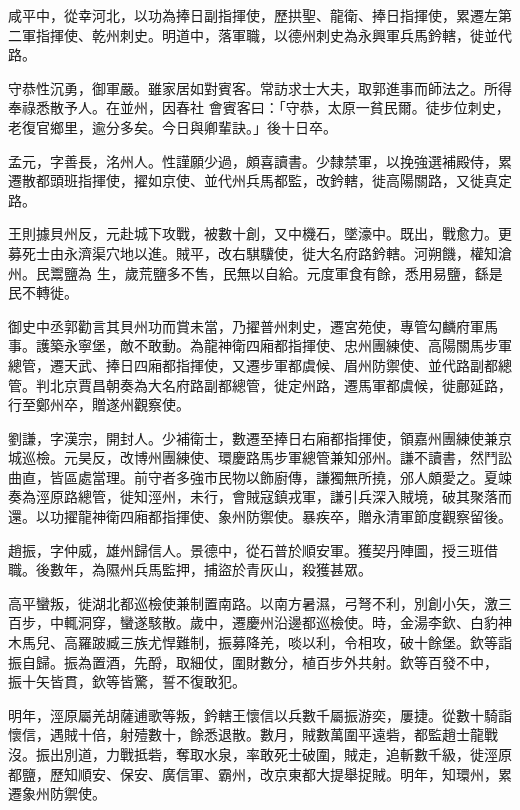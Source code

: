 \begin{pinyinscope}
 咸平中，從幸河北，以功為捧日副指揮使，歷拱聖、龍衛、捧日指揮使，累遷左第二軍指揮使、乾州刺史。明道中，落軍職，以德州刺史為永興軍兵馬鈐轄，徙並代路。



 守恭性沉勇，御軍嚴。雖家居如對賓客。常訪求士大夫，取郭進事而師法之。所得奉祿悉散予人。在並州，因春社
 會賓客曰：「守恭，太原一貧民爾。徒步位刺史，老復官鄉里，逾分多矣。今日與卿輩訣。」後十日卒。



 孟元，字善長，洺州人。性謹願少過，頗喜讀書。少隸禁軍，以挽強選補殿侍，累遷散都頭班指揮使，擢如京使、並代州兵馬都監，改鈐轄，徙高陽關路，又徙真定路。



 王則據貝州反，元赴城下攻戰，被數十創，又中機石，墜濠中。既出，戰愈力。更募死士由永濟渠穴地以進。賊平，改右騏驥使，徙大名府路鈐轄。河朔饑，權知滄州。民鬻鹽為
 生，歲荒鹽多不售，民無以自給。元度軍食有餘，悉用易鹽，繇是民不轉徙。



 御史中丞郭勸言其貝州功而賞未當，乃擢普州刺史，遷宮苑使，專管勾麟府軍馬事。護築永寧堡，敵不敢動。為龍神衛四廂都指揮使、忠州團練使、高陽關馬步軍總管，遷天武、捧日四廂都指揮使，又遷步軍都虞候、眉州防禦使、並代路副都總管。判北京賈昌朝奏為大名府路副都總管，徙定州路，遷馬軍都虞候，徙鄜延路，行至鄭州卒，贈遂州觀察使。



 劉謙，字漢宗，開封人。少補衛士，數遷至捧日右廂都指揮使，領嘉州團練使兼京城巡檢。元昊反，改博州團練使、環慶路馬步軍總管兼知邠州。謙不讀書，然鬥訟曲直，皆區處當理。前守者多強市民物以飾廚傳，謙獨無所撓，邠人頗愛之。夏竦奏為涇原路總管，徙知涇州，未行，會賊寇鎮戎軍，謙引兵深入賊境，破其聚落而還。以功擢龍神衛四廂都指揮使、象州防禦使。暴疾卒，贈永清軍節度觀察留後。



 趙振，字仲威，雄州歸信人。景德中，從石普於順安軍。獲契丹陣圖，授三班借職。後數年，為隰州兵馬監押，捕盜於青灰山，殺獲甚眾。



 高平蠻叛，徙湖北都巡檢使兼制置南路。以南方暑濕，弓弩不利，別創小矢，激三百步，中輒洞穿，蠻遂駭散。歲中，遷慶州沿邊都巡檢使。時，金湯李欽、白豹神木馬兒、高羅跛臧三族尤悍難制，振募降羌，啖以利，令相攻，破十餘堡。欽等詣振自歸。振為置酒，先酹，取細仗，圍財數分，植百步外共射。欽等百發不中，
 振十矢皆貫，欽等皆驚，誓不復敢犯。



 明年，涇原屬羌胡薩逋歌等叛，鈐轄王懷信以兵數千屬振游奕，屢捷。從數十騎詣懷信，遇賊十倍，射殪數十，餘悉退散。數月，賊數萬圍平遠砦，都監趙士龍戰沒。振出別道，力戰抵砦，奪取水泉，率敢死士破圍，賊走，追斬數千級，徙涇原都鹽，歷知順安、保安、廣信軍、霸州，改京東都大提舉捉賊。明年，知環州，累遷象州防禦使。




\end{pinyinscope}
